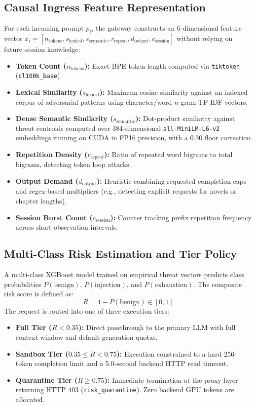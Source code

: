 \documentclass[runningheads]{article}
\begin{document}
\subsection{Causal Ingress Feature Representation}
For each incoming prompt $p_i$, the gateway constructs an 6-dimensional feature vector $x_i = [n_{\text{tokens}}, s_{\text{lexical}}, s_{\text{semantic}}, r_{\text{repeat}}, d_{\text{output}}, c_{\text{session}}]$ without relying on future session knowledge:
\begin{itemize}
    \item \textbf{Token Count ($n_{\text{tokens}}$):} Exact BPE token length computed via \texttt{tiktoken} (\texttt{cl100k\_base}).
    \item \textbf{Lexical Similarity ($s_{\text{lexical}}$):} Maximum cosine similarity against an indexed corpus of adversarial patterns using character/word $n$-gram TF-IDF vectors.
    \item \textbf{Dense Semantic Similarity ($s_{\text{semantic}}$):} Dot-product similarity against threat centroids computed over 384-dimensional \texttt{all-MiniLM-L6-v2} embeddings running on CUDA in FP16 precision, with a $0.30$ floor correction.
    \item \textbf{Repetition Density ($r_{\text{repeat}}$):} Ratio of repeated word bigrams to total bigrams, detecting token loop attacks.
    \item \textbf{Output Demand ($d_{\text{output}}$):} Heuristic combining requested completion caps and regex-based multipliers (e.g., detecting explicit requests for novels or chapter lengths).
    \item \textbf{Session Burst Count ($c_{\text{session}}$):} Counter tracking prefix repetition frequency across short observation intervals.
\end{itemize}

\subsection{Multi-Class Risk Estimation and Tier Policy}
A multi-class XGBoost model trained on empirical threat vectors predicts class probabilities $P(\text{benign})$, $P(\text{injection})$, and $P(\text{exhaustion})$. The composite risk score is defined as:
\begin{equation}
R = 1 - P(\text{benign}) \in [0, 1]
\end{equation}
The request is routed into one of three execution tiers:
\begin{itemize}
    \item \textbf{Full Tier ($R < 0.35$):} Direct passthrough to the primary LLM with full context window and default generation quotas.
    \item \textbf{Sandbox Tier ($0.35 \le R < 0.75$):} Execution constrained to a hard 256-token completion limit and a 5.0-second backend HTTP read timeout.
    \item \textbf{Quarantine Tier ($R \ge 0.75$):} Immediate termination at the proxy layer returning HTTP 403 (\texttt{risk\_quarantine}). Zero backend GPU tokens are allocated.
\end{itemize}
\end{document}
